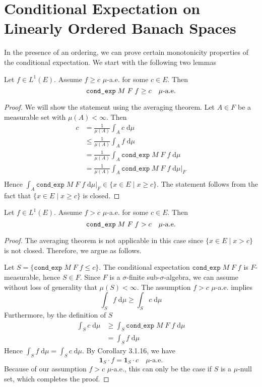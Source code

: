 \section{Conditional Expectation on Linearly Ordered Banach Spaces}

In the presence of an ordering, we can prove certain monotonicity properties of the conditional expectation. We start with the following two lemmas

\begin{lemma}
	Let $f \in L^1(E)$. Assume $f \ge c$ $\mu$-a.e. for some $c \in E$. Then 
	\[
		\normalfont\texttt{cond\_exp} \; M \; F \; f \ge c \quad \mu\textrm{-a.e.}
	\]
\end{lemma}
\begin{proof}
	We will show the statement using the averaging theorem. Let $A \in F$ be a measurable set with $\mu(A) < \infty$. Then
	\begin{align*}
		c &= \frac{1}{\mu(A)} \int_A c \; \textrm{d} \mu \\
		&\le \frac{1}{\mu(A)} \int_A f \; \textrm{d} \mu \\
		&= \frac{1}{\mu(A)} \int_A \texttt{cond\_exp} \; M \; F \; f \; \textrm{d} \mu \\
		&= \frac{1}{\mu(A)} \int_A \texttt{cond\_exp} \; M \; F \; f \; \textrm{d} \mu\vert_F \\
	\end{align*}
	Hence $\int_A \texttt{cond\_exp} \; M \; F \; f \; \textrm{d} \mu\vert_F \in \{x \in E \;\vert\; x \ge c \}$. The statement follows from the fact that $\{x \in E \;\vert\; x \ge c \}$ is closed.
\end{proof}

\begin{lemma}
	Let $f \in L^1(E)$. Assume $f > c$ $\mu$-a.e. for some $c \in E$. Then 
	\[
		\normalfont\texttt{cond\_exp} \; M \; F \; f > c \quad \mu\textrm{-a.e.}
	\]
\end{lemma}
\begin{proof}
	The averaging theorem is not applicable in this case since $\{x \in E \;\vert\; x > c \}$ is not closed. Therefore, we argue as follows.
	
	Let $S = \{\texttt{cond\_exp} \; M \; F \; f \le c\}$. The conditional expectation $\texttt{cond\_exp} \; M \; F \; f$ is $F$-measurable, hence $S \in F$. Since $F$ is a $\sigma$-finite sub-$\sigma$-algebra, we can assume without loss of generality that $\mu(S) < \infty$.
	The assumption $f > c$ $\mu$-a.e. implies
	\[
		\int_S f \; \textrm{d} \mu \ge \int_S c \; \textrm{d} \mu
	\]
	Furthermore, by the definition of $S$
	\begin{align*}
		\int_S c \; \textrm{d} \mu &\ge \int_S \texttt{cond\_exp} \; M \; F \; f \; \textrm{d} \mu \\
		&= \int_S f \; \textrm{d} \mu
	\end{align*}
	Hence $\int_S f \; \textrm{d} \mu = \int_S c \; \textrm{d} \mu$. By Corollary 3.1.16, we have
	\[
		\mathbf{1}_S \cdot f = \mathbf{1}_S \cdot c \quad \mu\textrm{-a.e.}
	\]
	Because of our assumption $f > c$ $\mu$-a.e., this can only be the case if $S$ is a $\mu$-null set, which completes the proof.
\end{proof}

